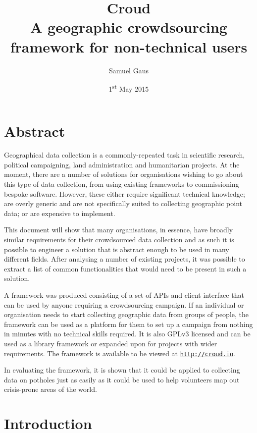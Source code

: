 \documentclass{article}
\let\oldsection\section
\renewcommand\section{\clearpage\oldsection}
\begin{document}
	\title{Croud \\ \vspace{2 mm} {\large A geographic crowdsourcing framework for non-technical users}}
	\author{Samuel Gaus}
	\date{1\textsuperscript{st} May 2015}
	\maketitle

	\tableofcontents

	\section*{Abstract}
	\label{sec:summary}
		Geographical data collection is a commonly-repeated task in scientific research, political campaigning, land administration and humanitarian projects. At the moment, there are a number of solutions for organisations wishing to go about this type of data collection, from using existing frameworks to commissioning bespoke software. However, these either require significant technical knowledge; are overly generic and are not specifically suited to collecting geographic point data; or are expensive to implement.

		This document will show that many organisations, in essence, have broadly similar requirements for their crowdsourced data collection and as such it is possible to engineer a solution that is abstract enough to be used in many different fields. After analysing a number of existing projects, it was possible to extract a list of common functionalities that would need to be present in such a solution.

		A framework was produced consisting of a set of APIs and client interface that can be used by anyone requiring a crowdsourcing campaign. If an individual or organisation needs to start collecting geographic data from groups of people, the framework can be used as a platform for them to set up a campaign from nothing in minutes with no technical skills required. It is also GPLv3 licensed and can be used as a library framework or expanded upon for projects with wider requirements. The framework is available to be viewed at \href{http://croud.io}{\nolinkurl{http://croud.io}}.

		In evaluating the framework, it is shown that it could be applied to collecting data on potholes just as easily as it could be used to help volunteers map out crisis-prone areas of the world.

	\section{Introduction}
	\label{sec:introduction}
\end{document}
